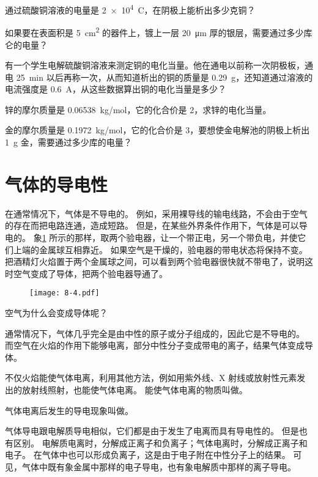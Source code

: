 \begin{Practice}
\begin{question}
  \item 通过硫酸铜溶液的电量是 \qty{2e4}{C}，在阴极上能析出多少克铜？
  \item 如果要在表面积是 \qty{5}{cm^2} 的器件上，镀上一层 \qty{20}{\micro m} 厚的银层，需要通过多少库仑的电量？
  \item 有一个学生电解硫酸铜溶液来测定铜的电化当量。他在通电以前称一次阴极板，通电 \qty{25}{min} 以后再称一次，从而知道析出的铜的质量是 \qty{0.29}{g}，还知道通过溶液的电流强度是 \qty{0.6}{A}，从这些数据算出铜的电化当量是多少？
  \item 锌的摩尔质量是 \qty{0.06538}{kg/mol}，它的化合价是 2，求锌的电化当量。
  \item 金的摩尔质量是 \qty{0.1972}{kg/mol}，它的化合价是 3，要想使金电解池的阴极上析出 \qty{1}{g} 金，需要通过多少库的电量？
\end{question}
\end{Practice}


\section{气体的导电性}
在通常情况下，气体是不导电的。
例如，采用裸导线的输电线路，不会由于空气的存在而把电路连通，造成短路。
但是，在某些外界条件作用下，气体是可以导电的。
象\cref{fig:8-4} 所示的那样，取两个验电器，让一个带正电，另一个带负电，并使它们上端的金属球互相靠近。
如果空气是干燥的，验电器的带电状态将保持不变。
把酒精灯火焰置于两个金属球之间，可以看到两个验电器很快就不带电了，说明这时空气变成了导体，把两个验电器导通了。
\begin{figure}
  \texttt{[image: 8-4.pdf]}
  \caption{}\label{fig:8-4}
\end{figure}

空气为什么会变成导体呢？

通常情况下，气体几乎完全是由中性的原子或分子组成的，因此它是不导电的。
而空气在火焰的作用下能够电离，部分中性分子变成带电的离子，结果气体变成导体。

不仅火焰能使气体电离，利用其他方法，例如用紫外线、X 射线或放射性元素发出的放射线照射，也能使气体电离。
能使气体电离的物质叫做。

气体电离后发生的导电现象叫做。

气体导电跟电解质导电相似，它们都是由于发生了电离而具有导电性的。
但是也有区别。
电解质电离时，分解成正离子和负离子；气体电离时，分解成正离子和电子。
在气体中也可以形成负离子，这是由于电子附在中性分子上的结果。
可见，气体中既有象金属中那样的电子导电，也有象电解质中那样的离子导电。

